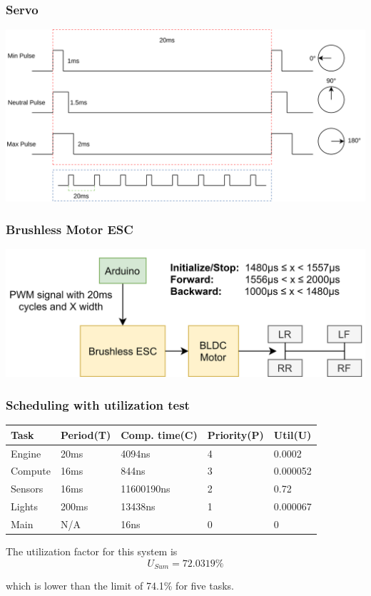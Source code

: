 \documentclass{beamer}
\begin{document}
    \begin{frame}
        \frametitle{Servo}
        \includegraphics[width=\linewidth]{img/servo.png}
    \end{frame}

    \begin{frame}
        \frametitle{Brushless Motor ESC}
        \includegraphics[width=\linewidth]{img/brushless-motor-esc}
    \end{frame}

    \begin{frame}
        \frametitle{Scheduling with utilization test}
        \begin{center}
            \begin{tabular}{||l l l l|l||}
                \hline
                Task & Period(T) & Comp. time(C) & Priority(P) & Util(U) \\ [0.5ex]
                \hline\hline
                Engine & 20ms & 4094ns & 4 & 0.0002 \\
                \hline
                Compute & 16ms & 844ns & 3 & 0.000052 \\
                \hline
                Sensors & 16ms & 11600190ns & 2 & 0.72 \\
                \hline
                Lights & 200ms & 13438ns & 1 & 0.000067 \\
                \hline
                Main & N/A & 16ns & 0 & 0 \\ [1ex]
                \hline
            \end{tabular}
        \end{center}

        The utilization factor for this system is
        \begin{equation*}
            U_{Sum} = 72.0319\%
        \end{equation*}

        which is lower than the limit of 74.1\% for five tasks.
    \end{frame}
\end{document}
